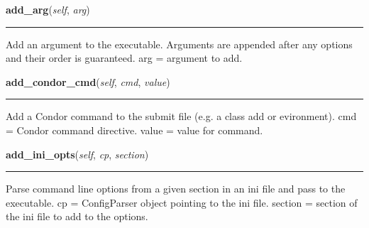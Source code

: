     \noindent\begin{boxedminipage}{\textwidth}

    \raggedright \textbf{add\_arg}(\textit{self}, \textit{arg})

    \vspace{-1.5ex}

    \rule{\textwidth}{0.5\fboxrule}
    Add an argument to the executable. Arguments are appended after any 
    options and their order is guaranteed. arg = argument to add.

    \vspace{1ex}

    \end{boxedminipage}

    \label{pipeline:CondorJob:add_condor_cmd}
    \vspace{0.5ex}

    \noindent\begin{boxedminipage}{\textwidth}

    \raggedright \textbf{add\_condor\_cmd}(\textit{self}, \textit{cmd}, \textit{value})

    \vspace{-1.5ex}

    \rule{\textwidth}{0.5\fboxrule}
    Add a Condor command to the submit file (e.g. a class add or 
    evironment). cmd = Condor command directive. value = value for 
    command.

    \vspace{1ex}

    \end{boxedminipage}

    \label{pipeline:CondorJob:add_ini_opts}
    \vspace{0.5ex}

    \noindent\begin{boxedminipage}{\textwidth}

    \raggedright \textbf{add\_ini\_opts}(\textit{self}, \textit{cp}, \textit{section})

    \vspace{-1.5ex}

    \rule{\textwidth}{0.5\fboxrule}
    Parse command line options from a given section in an ini file and 
    pass to the executable. cp = ConfigParser object pointing to the ini 
    file. section = section of the ini file to add to the options.

    \vspace{1ex}

    \end{boxedminipage}

